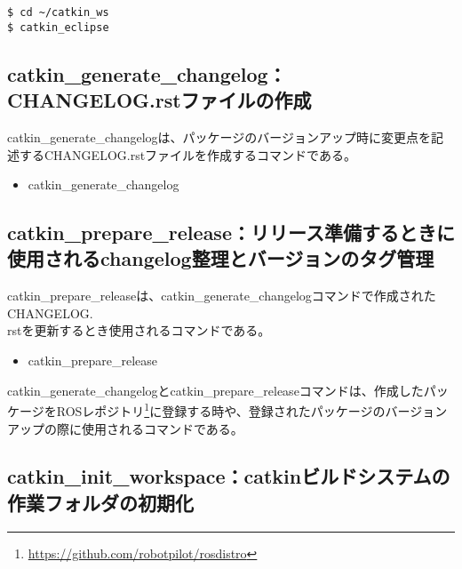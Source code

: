 \begin{lstlisting}[language=ROS]
$ cd ~/catkin_ws
$ catkin_eclipse
\end{lstlisting}

\subsection{catkin\_generate\_changelog：CHANGELOG.rstファイルの作成}

catkin\_generate\_changelogは、パッケージのバージョンアップ時に変更点を記述するCHANGELOG.rstファイルを作成するコマンドである。

\vspace{\baselineskip}
\begin{itemize}
\item catkin\_generate\_changelog
\end{itemize}
\vspace{\baselineskip}

\subsection{catkin\_prepare\_release：リリース準備するときに使用されるchangelog整理とバージョンのタグ管理}

catkin\_prepare\_releaseは、catkin\_generate\_changelogコマンドで作成されたCHANGELOG.\\rstを更新するとき使用されるコマンドである。

\vspace{\baselineskip}
\begin{itemize}
\item catkin\_prepare\_release
\end{itemize}
\vspace{\baselineskip}

catkin\_generate\_changelogとcatkin\_prepare\_releaseコマンドは、作成したパッケージをROSレポジトリ\footnote{\url{https://github.com/robotpilot/rosdistro}}に登録する時や、登録されたパッケージのバージョンアップの際に使用されるコマンドである。

\subsection{catkin\_init\_workspace：catkinビルドシステムの作業フォルダの初期化}

